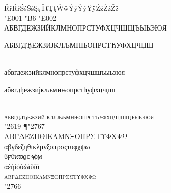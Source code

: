 \documentclass[pagesize,DIV14]{scrartcl}
\begin{document}
\begin{center}
{{ŘřŔŕŚśŠšŞşŤťŢţŴŵÝýŶŷŸÿŹźŻżŽž}\\
{\Huge \char"E001 \char"B6 \char"E002}\\
АБВГДЕЖЗИЙКЛМНОПРСТУФХЦЧШЩЪЫЬЭЮЯ\\
\begin{serbian}{АБВГДЂЕЖЗИЈКЛЉМНЊОПРСТЋУФХЦЧЏШ}\end{serbian}\\
абвгдежзийклмнопрстуфхцчшщъыьэюя\\
\begin{serbian}{
абвгдђежзијклљмнњопрстћуфхцчџш}\end{serbian}\\
\textsc{абвгд{д}ђежзийјкл{л}љ{љ}мнњопрстћуфхцчџшщъыьэюя}\\
{\Huge \char"2619 {¶}\char"2767}\\
ΑΒΓΔΕΖΗΘΙΚΛΜΝΞΟΠΡΣΤΥΦΧΨΩ\\
αβγδεζηθικλμνξοπρσςτυφχψω\\
ϐϝϑϰϖϱϲϡϕϻ\\
άέήίόύώϊϋΐΰ\\
\textsc{αβγδεζηθικλμνξοπρσςτυφχψω}\\
{\Huge \char"2766}\\
}
\end{center}
\clearpage
\fontsize{16}{16}\itshape
\end{document}
